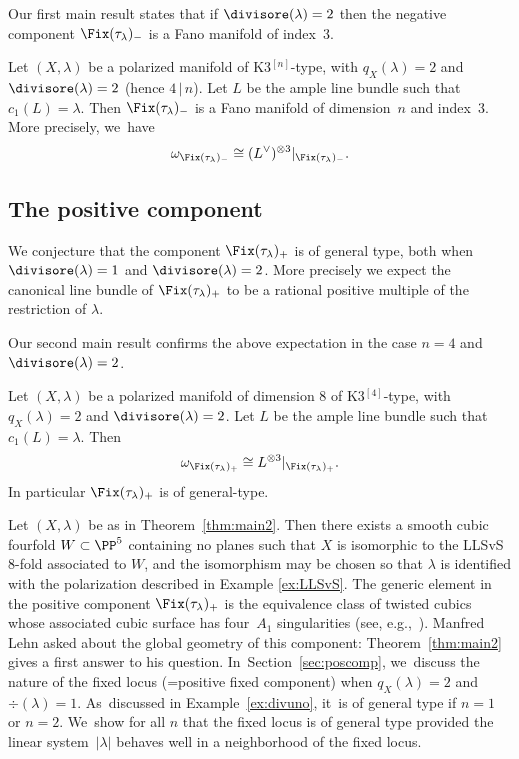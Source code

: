 Our first main result states that if $\divisore(\lambda)=2$ then the negative component $\Fix(\tau_{\lambda})_-$ is a Fano manifold of index~3.

\begin{theo}\label{thm:main1}
Let $(X,\lambda)$ be a polarized \HK manifold of \textup{K3}$^{[n]}$-type, with $q_X(\lambda)=2$ and $\divisore(\lambda)=2$ (hence $4\,|\,n$).
Let $L$ be the ample line bundle such that $c_1(L)=\lambda$.
Then $\Fix(\tau_{\lambda})_-$ is a Fano manifold of dimension~$n$ and index~$3$. More precisely, we~have
\begin{equation}\label{canmenotre}
\omega_{\Fix(\tau_{\lambda})_-}\cong (L^{\vee})^{\otimes 3} \vert_{\Fix(\tau_{\lambda})_-}.
\end{equation}
\end{theo}

\subsection{The positive component}\label{subsec:LehnQuestion}

We conjecture that the component $\Fix(\tau_{\lambda})_+$ is of general type, both when $\divisore(\lambda)=1$ and $\divisore(\lambda)=2$.
More precisely we expect the canonical line bundle of $\Fix(\tau_{\lambda})_+$ to be a rational positive multiple of the restriction of $\lambda$.

Our second main result confirms the above expectation in the case $n=4$ and $\divisore(\lambda)=2$.

\begin{theo}\label{thm:main2}
Let $(X,\lambda)$ be a polarized \HK manifold of dimension $8$ of \textup{K3}$^{[4]}$-type, with $q_X(\lambda)=2$ and $\divisore(\lambda)=2$. Let $L$ be the ample line bundle such that $c_1(L)=\lambda$.
Then
\[
\omega_{\Fix(\tau_{\lambda})_+}\cong L^{\otimes 3}\vert_{\Fix(\tau_{\lambda})_+}.
\]
In particular $\Fix(\tau_{\lambda})_+$ is of general-type.
\end{theo}

Let $(X,\lambda)$ be as in Theorem~\ref{thm:main2}.
Then there exists a smooth cubic fourfold $W\subset\PP^5$ containing no planes such that $X$ is isomorphic to the LLSvS $8$-fold associated to $W$, and the isomorphism may be chosen so that $\lambda$ is identified with the polarization described in Example \ref{ex:LLSvS}.
The generic element in the positive component $\Fix(\tau_{\lambda})_+$ is the equivalence class of twisted cubics whose associated cubic surface has four~$A_1$ singularities (see, e.g.,~\cite{Lehn:Oberwolfach}).
Manfred Lehn asked about the global geometry of this component: Theorem~\ref{thm:main2} gives a first answer to his question. In~Section~\ref{sec:poscomp}, we~discuss the nature of the fixed locus (=positive fixed component) when $q_X(\lambda)=2$ and $\div(\lambda)=1$. As~discussed in Example~\ref{ex:divuno}, it~is of general type
if $n=1$ or $n=2$. We~show for all $n$ that the fixed locus is of general type provided the linear system~$|\lambda|$ behaves well in a neighborhood of the fixed locus.

